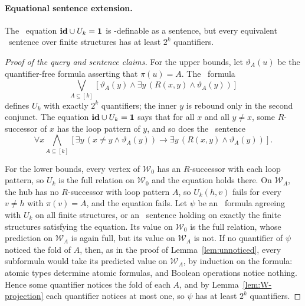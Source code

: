 \paragraph{Equational sentence extension.}
The \CoR\ equation $\mathbf{id}\cup U_k=\mathbf{1}$ is \FOtwo-definable as a
sentence, but every equivalent \FOtwo\ sentence over finite
structures has at least $2^k$ quantifiers.
\begin{proof}[Proof of the query and sentence claims]
For the upper bounds, let $\vartheta_A(u)$ be the quantifier-free
formula asserting that $\pi(u)=A$. The \FOtwo\ formula
\[
 \bigvee_{A\subseteq[k]}\left[\vartheta_A(y)\land
       \exists y\,(R(x,y)\land\vartheta_A(y))\right]
\]
defines $U_k$ with exactly $2^k$ quantifiers; the inner $y$ is rebound
only in the second conjunct. The equation $\mathbf{id}\cup U_k=\mathbf{1}$ says that
for all $x$ and all $y\ne x$, some $R$-successor of $x$ has the loop
pattern of $y$, and so does the \FOtwo\ sentence
\[
 \forall x\bigwedge_{A\subseteq[k]}\left[
 \exists y\,(x \neq y\land\vartheta_A(y))\rightarrow
 \exists y\,(R(x,y)\land\vartheta_A(y))\right].
\]

For the lower bounds, every vertex of $\mathcal W_0$ has an $R$-successor
with each loop pattern, so $U_k$ is the full relation on $\mathcal W_0$
and the equation holds there. On $\mathcal W_A$, the hub has no
$R$-successor with loop pattern $A$, so $U_k(h,v)$ fails for every
$v\ne h$ with $\pi(v)=A$, and the equation fails. Let $\psi$ be an
\FOtwo\ formula agreeing with $U_k$ on all finite structures, or an
\FOtwo\ sentence holding on exactly the finite structures satisfying
the equation. Its value on $\mathcal W_0$ is the full relation, whose
prediction on $\mathcal W_A$ is again full, but its value on
$\mathcal W_A$ is not. If no quantifier of $\psi$ noticed the fold of
$A$, then, as in the proof of Lemma~\ref{lem:unnoticed}, every subformula
would take its predicted value on $\mathcal W_A$, by induction on the
formula: atomic types determine atomic formulas, and Boolean operations
notice nothing. Hence some quantifier notices the fold of each $A$, and
by Lemma~\ref{lem:W-projection} each quantifier notices at most one, so
$\psi$ has at least $2^k$ quantifiers.
\end{proof}
